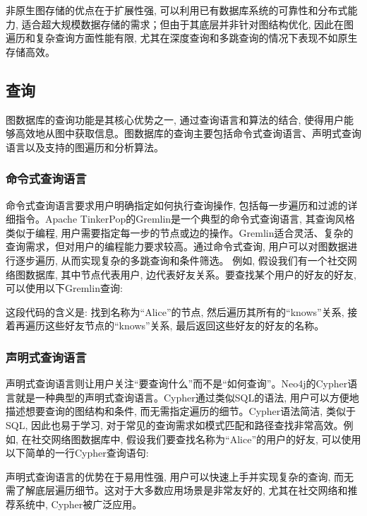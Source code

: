 非原生图存储的优点在于扩展性强, 可以利用已有数据库系统的可靠性和分布式能力, 适合超大规模数据存储的需求；但由于其底层并非针对图结构优化, 因此在图遍历和复杂查询方面性能有限, 尤其在深度查询和多跳查询的情况下表现不如原生存储高效。

\subsection{查询}

图数据库的查询功能是其核心优势之一, 通过查询语言和算法的结合, 使得用户能够高效地从图中获取信息。图数据库的查询主要包括命令式查询语言、声明式查询语言以及支持的图遍历和分析算法。
\subsubsection*{命令式查询语言}

命令式查询语言要求用户明确指定如何执行查询操作, 包括每一步遍历和过滤的详细指令。Apache TinkerPop的Gremlin是一个典型的命令式查询语言, 其查询风格类似于编程, 用户需要指定每一步的节点或边的操作。Gremlin适合灵活、复杂的查询需求，但对用户的编程能力要求较高。通过命令式查询, 用户可以对图数据进行逐步遍历, 从而实现复杂的多跳查询和条件筛选。
例如, 假设我们有一个社交网络图数据库, 其中节点代表用户, 边代表好友关系。要查找某个用户的好友的好友, 可以使用以下Gremlin查询:


这段代码的含义是: 找到名称为“Alice”的节点, 然后遍历其所有的“knows”关系, 接着再遍历这些好友节点的“knows”关系, 最后返回这些好友的好友的名称。

\subsubsection*{声明式查询语言}

声明式查询语言则让用户关注“要查询什么”而不是“如何查询”。Neo4j的Cypher语言就是一种典型的声明式查询语言。Cypher通过类似SQL的语法, 用户可以方便地描述想要查询的图结构和条件, 而无需指定遍历的细节。Cypher语法简洁, 类似于SQL, 因此也易于学习, 对于常见的查询需求如模式匹配和路径查找非常高效。例如, 在社交网络图数据库中, 假设我们要查找名称为“Alice”的用户的好友, 可以使用以下简单的一行Cypher查询语句:


声明式查询语言的优势在于易用性强, 用户可以快速上手并实现复杂的查询, 而无需了解底层遍历细节。这对于大多数应用场景是非常友好的, 尤其在社交网络和推荐系统中, Cypher被广泛应用。

